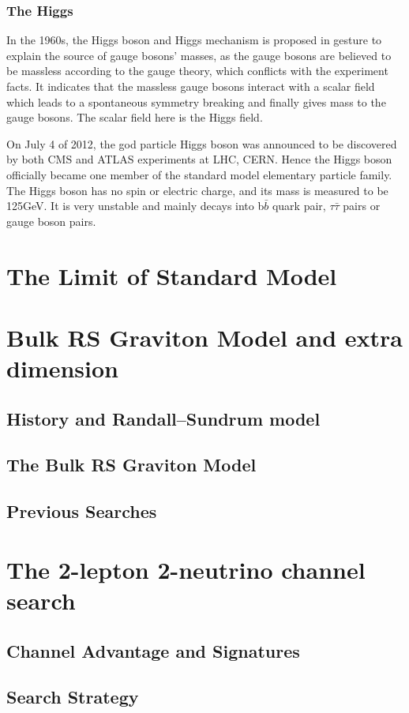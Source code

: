 \subsubsection{The Higgs}
In the 1960s, the Higgs boson and Higgs mechanism is proposed in gesture to explain the source of gauge bosons' masses\cite{higgstheory1}\cite{higgstheory2}\cite{higgstheory3}, as the gauge bosons are believed to be massless according to the gauge theory, which conflicts with the experiment facts. It indicates that the massless gauge bosons interact with a scalar field which leads to a spontaneous symmetry breaking and finally gives mass to the gauge bosons. The scalar field here is the Higgs field. 

\vspace{0.3cm}
On July 4 of 2012, the god particle Higgs boson was announced to be discovered by both CMS and ATLAS experiments at LHC, CERN\cite{higgsdiscover1}\cite{higgsdiscover2}. Hence the Higgs boson officially became one member of the standard model elementary particle family. The Higgs boson has no spin or electric charge, and its mass is measured to be 125GeV. It is very unstable and mainly decays into b$\bar{b}$ quark pair, $\tau\bar{\tau}$ pairs or gauge boson pairs.

\section{The Limit of Standard Model}


\section{Bulk RS Graviton Model and extra dimension}
\subsection{History and Randall–Sundrum model}
\subsection{The Bulk RS Graviton Model}
\subsection{Previous Searches}

\section{The 2-lepton 2-neutrino channel search}
\subsection{Channel Advantage and Signatures}
\subsection{Search Strategy}


